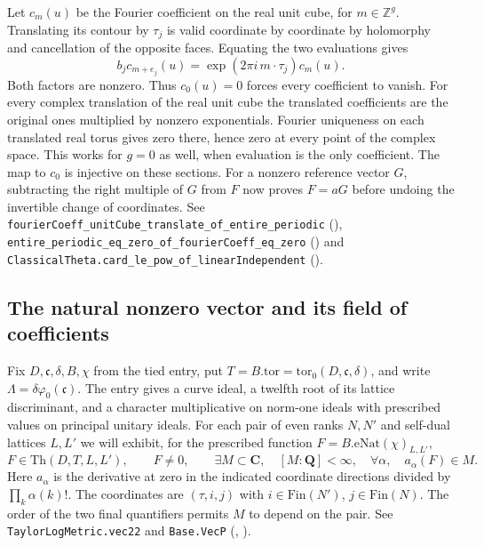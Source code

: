 Let $c_m(u)$ be the Fourier coefficient on the real unit cube, for
$m\in\mathbb Z^g$. Translating its contour by $\tau_j$ is valid coordinate
by coordinate by holomorphy and cancellation of the opposite faces.
Equating the two evaluations gives
\[
 b_jc_{m+e_j}(u)=\exp(2\pi i\,m\cdot\tau_j)c_m(u).
\]
Both factors are nonzero. Thus $c_0(u)=0$ forces every coefficient to vanish.
For every complex translation of the real unit cube the translated
coefficients are the original ones multiplied by nonzero exponentials.
Fourier uniqueness on each translated real torus gives zero there, hence
zero at every point of the complex space.
This works for $g=0$ as well, when evaluation is the only coefficient.
The map to $c_0$ is injective on these sections. For a nonzero reference
vector $G$, subtracting the right multiple of $G$ from $F$ now proves
$F=aG$ before undoing the invertible change of coordinates.
See \nolinkurl{fourierCoeff_unitCube_translate_of_entire_periodic}
(),
\nolinkurl{entire_periodic_eq_zero_of_fourierCoeff_eq_zero}
()
and \nolinkurl{ClassicalTheta.card_le_pow_of_linearIndependent}
().

\subsection{The natural nonzero vector and its field of coefficients}
\label{r14:vec}
Fix \(D,\mathfrak c,\delta,B,\chi\) from the tied entry, put
\(T=B.\mathrm{tor}=\mathrm{tor}_0(D,\mathfrak c,\delta)\), and write
\(\Lambda=\delta\varphi_0(\mathfrak c)\).
The entry gives a curve ideal, a twelfth root of its lattice discriminant,
and a character multiplicative on norm-one ideals with prescribed values on
principal unitary ideals. For each pair of even ranks \(N,N'\) and
self-dual lattices \(L,L'\) we will exhibit, for the prescribed function
\(F=B.\mathrm{eNat}(\chi)_{L,L'}\),
\[
 F\in\mathrm{Th}(D,T,L,L'),\qquad F\ne0,\qquad
 \exists M\subset\mathbf C,\quad [M:\mathbf Q]<\infty,\quad
 \forall\alpha,\quad a_\alpha(F)\in M .
\]
Here \(a_\alpha\) is the derivative at zero in the indicated coordinate
directions divided by \(\prod_k\alpha(k)!\). The coordinates are
\((\tau,i,j)\) with \(i\in\mathrm{Fin}(N')\), \(j\in\mathrm{Fin}(N)\).
The order of the two final quantifiers permits \(M\) to depend on the
pair. See \nolinkurl{TaylorLogMetric.vec22} and
\nolinkurl{Base.VecP} (,
).

